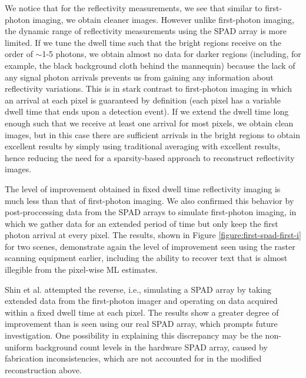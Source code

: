 We notice that for the reflectivity measurements, we see that similar to first-photon imaging, we obtain cleaner images. However unlike first-photon imaging, the dynamic range of reflectivity measurements using the SPAD array is more limited. If we tune the dwell time such that the bright regions receive on the order of $\sim$1-5 photons, we obtain almost no data for darker regions (including, for example, the black background cloth behind the mannequin) because the lack of any signal photon arrivals prevents us from gaining any information about reflectivity variations. This is in stark contrast to first-photon imaging in which an arrival at each pixel is guaranteed by definition (each pixel has a variable dwell time that ends upon a detection event). If we extend the dwell time long enough such that we receive at least one arrival for most pixels, we obtain clean images, but in this case there are sufficient arrivals in the bright regions to obtain excellent results by simply using traditional averaging with excellent results, hence reducing the need for a sparsity-based approach to reconstruct reflectivity images.

The level of improvement obtained in fixed dwell time reflectivity imaging is much less than that of first-photon imaging. We also confirmed this behavior by post-proccessing data from the SPAD arrays to simulate first-photon imaging, in which we gather data for an extended period of time but only keep the first photon arrival at every pixel. The results, shown in Figure \ref{figure:first-spad-first-i} for two scenes, demonstrate again the level of improvement seen using the raster scanning equipment earlier, including the ability to recover text that is almost illegible from the pixel-wise ML estimates.

Shin et al. \cite{kirmani-photon} attempted the reverse, i.e., simulating a SPAD array by taking extended data from the first-photon imager and operating on data acquired within a fixed dwell time at each pixel. The results show a greater degree of improvement than is seen using our real SPAD array, which prompts future investigation. One possibility in explaining this discrepancy may be the non-uniform background count levels in the hardware SPAD array, caused by fabrication inconsistencies, which are not accounted for in the modified reconstruction above.

